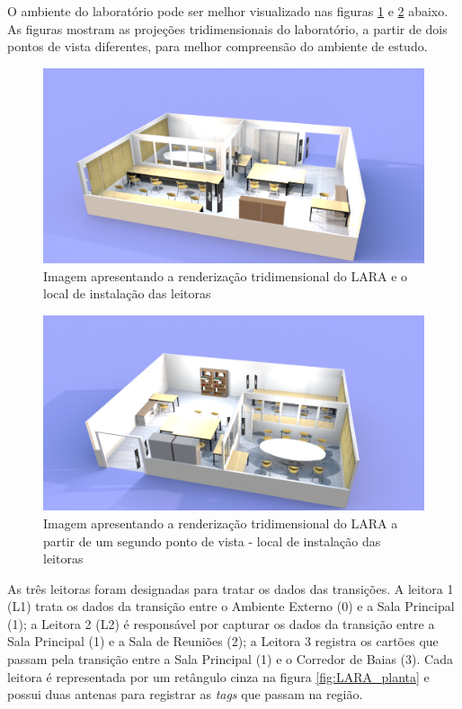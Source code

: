 O ambiente do laboratório pode ser melhor visualizado nas figuras \ref{fig:LARA1} e \ref{fig:LARA2} abaixo. As figuras mostram as projeções tridimensionais do laboratório, a partir de dois pontos de vista diferentes, para melhor compreensão do ambiente de estudo.

  \begin{figure}[H]
    \centering
    \includegraphics[width=1\linewidth]{figs/Metodologia/LARA_leitoras-1.png}
    \caption{Imagem apresentando a renderização tridimensional do LARA e o local de instalação das leitoras}
    \label{fig:LARA1}
\end{figure}

  \begin{figure}[H]
    \centering
    \includegraphics[width=1\linewidth]{figs/Metodologia/LARA_leitoras-2.png}
    \caption{Imagem apresentando a renderização tridimensional do LARA a partir de um segundo ponto de vista - local de instalação das leitoras}
    \label{fig:LARA2}
\end{figure}

As três leitoras foram designadas para tratar os dados das transições. A leitora 1 (L1) trata os dados da transição entre o Ambiente Externo (0) e a Sala Principal (1); a Leitora 2 (L2) é responsável por capturar os dados da transição entre a Sala Principal (1) e a Sala de Reuniões (2); a Leitora 3 registra os cartões que passam pela transição entre a Sala Principal (1) e o Corredor de Baias (3). Cada leitora é representada por um retângulo cinza na figura \ref{fig:LARA_planta} e possui duas antenas para registrar as \textit{tags} que passam na região.

